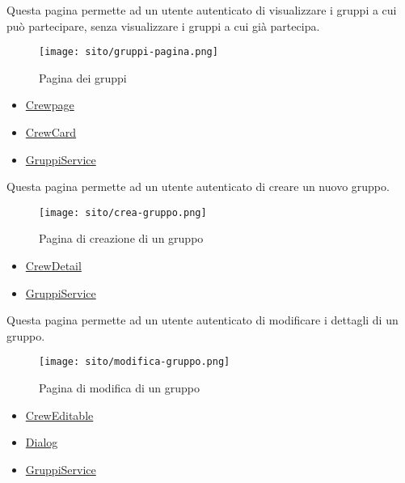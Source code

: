 Questa pagina permette ad un utente autenticato di visualizzare i gruppi a cui può partecipare, senza visualizzare i gruppi a cui già partecipa. 
\begin{figure}[H] 
    \centering 
    \texttt{[image: sito/gruppi-pagina.png]} 
    \caption{Pagina dei gruppi}
\end{figure}
\begin{itemize}
    \item \hyperref[par:Crewpage]{Crewpage}
    \item \hyperref[par:CrewCard]{CrewCard}
\end{itemize}
\begin{itemize}
    \item \hyperref[par:GruppiService]{GruppiService}
\end{itemize}

Questa pagina permette ad un utente autenticato di creare un nuovo gruppo. 
\begin{figure}[H] 
    \centerline{\texttt{[image: sito/crea-gruppo.png]}}     
    \caption{Pagina di creazione di un gruppo}
\end{figure}
\begin{itemize}
    \item \hyperref[par:CrewDetail]{CrewDetail}
\end{itemize}
\begin{itemize}
    \item \hyperref[par:GruppiService]{GruppiService}
\end{itemize}

Questa pagina permette ad un utente autenticato di modificare i dettagli di un gruppo. 
\begin{figure}[H] 
    \centerline{\texttt{[image: sito/modifica-gruppo.png]}} 
    \caption{Pagina di modifica di un gruppo}
\end{figure}
\begin{itemize}
    \item \hyperref[par:CrewEditable]{CrewEditable}
    \item \hyperref[par:Dialog]{Dialog}
\end{itemize}
\begin{itemize}
    \item \hyperref[par:GruppiService]{GruppiService}
\end{itemize}

